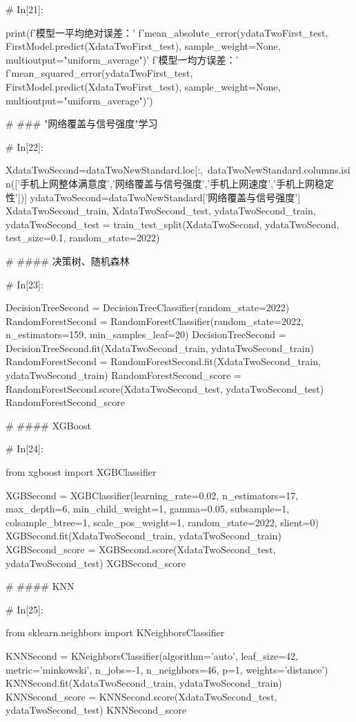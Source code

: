 \documentclass{MathorCupmodeling}
\begin{document}
\begin{python}
# In[21]:


print(f'模型一平均绝对误差：'
      f'{mean_absolute_error(ydataTwoFirst_test, FirstModel.predict(XdataTwoFirst_test), sample_weight=None, multioutput="uniform_average")}\n'
      f'模型一均方误差：'
      f'{mean_squared_error(ydataTwoFirst_test, FirstModel.predict(XdataTwoFirst_test), sample_weight=None, multioutput="uniform_average")}')


# ### "网络覆盖与信号强度"学习

# In[22]:


XdataTwoSecond=dataTwoNewStandard.loc[:,~dataTwoNewStandard.columns.isin(['手机上网整体满意度','网络覆盖与信号强度','手机上网速度','手机上网稳定性'])]
ydataTwoSecond=dataTwoNewStandard['网络覆盖与信号强度']
XdataTwoSecond_train, XdataTwoSecond_test, ydataTwoSecond_train, ydataTwoSecond_test = train_test_split(XdataTwoSecond, ydataTwoSecond, test_size=0.1, random_state=2022)


# #### 决策树、随机森林

# In[23]:


DecisionTreeSecond = DecisionTreeClassifier(random_state=2022)
RandomForestSecond = RandomForestClassifier(random_state=2022, n_estimators=159, min_samples_leaf=20)
DecisionTreeSecond = DecisionTreeSecond.fit(XdataTwoSecond_train, ydataTwoSecond_train)
RandomForestSecond = RandomForestSecond.fit(XdataTwoSecond_train, ydataTwoSecond_train)
RandomForestSecond_score = RandomForestSecond.score(XdataTwoSecond_test, ydataTwoSecond_test)
RandomForestSecond_score


# #### XGBoost

# In[24]:


from xgboost import XGBClassifier

XGBSecond = XGBClassifier(learning_rate=0.02,
                          n_estimators=17,
                          max_depth=6,
                          min_child_weight=1,
                          gamma=0.05,
                          subsample=1,
                          colsample_btree=1,
                          scale_pos_weight=1,
                          random_state=2022,
                          slient=0)
XGBSecond.fit(XdataTwoSecond_train, ydataTwoSecond_train)
XGBSecond_score = XGBSecond.score(XdataTwoSecond_test, ydataTwoSecond_test)
XGBSecond_score


# #### KNN

# In[25]:


from sklearn.neighbors import KNeighborsClassifier

KNNSecond = KNeighborsClassifier(algorithm='auto', leaf_size=42,
                                 metric='minkowski',
                                 n_jobs=-1,
                                 n_neighbors=46, p=1,
                                 weights='distance')
KNNSecond.fit(XdataTwoSecond_train, ydataTwoSecond_train)
KNNSecond_score = KNNSecond.score(XdataTwoSecond_test, ydataTwoSecond_test)
KNNSecond_score



\end{python}
\end{document}
